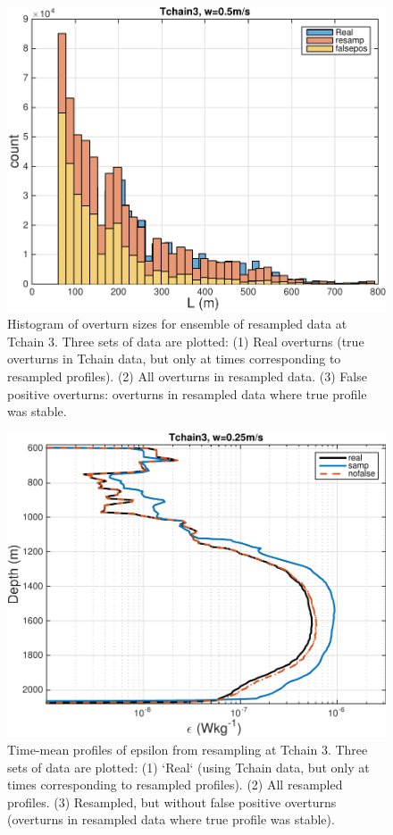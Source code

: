 \documentclass[11pt]{article}
\begin{document}
\begin{figure}[htbp]
\includegraphics[scale=0.8]{Tchain3_Test2_LotHistFalsePos.pdf}
\caption{Histogram of overturn sizes for ensemble of resampled data at Tchain 3.  Three sets of data are plotted: (1) Real overturns (true overturns in Tchain data, but only at times corresponding to resampled profiles). (2) All overturns in resampled data. (3) False positive overturns: overturns in resampled data where true profile was stable.}
\label{T3_FalsePosHist}
\end{figure}


\begin{figure}[htbp]
\includegraphics[scale=0.8]{Tchain3_Test1_EpsProfFalsePos.pdf}
\caption{ Time-mean profiles of epsilon from resampling at Tchain 3. Three sets of data are plotted: (1) `Real` (using  Tchain data, but only at times corresponding to resampled profiles). (2) All resampled profiles. (3) Resampled, but without false positive overturns (overturns in resampled data where true profile was stable).}
\label{T3_FalsePosProf}
\end{figure}
\end{document}
